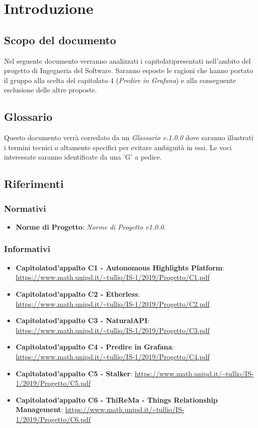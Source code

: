 \section{Introduzione}
\subsection{Scopo del documento}
    Nel seguente documento verranno analizzati i capitolati\glosp presentati nell'ambito del progetto di Ingegneria del Software. Saranno esposte le ragioni che hanno portato il gruppo alla scelta del capitolato 4 (\textit{Predire in Grafana}) e alla conseguente esclusione delle altre proposte.
\subsection{Glossario}
    Questo documento verrà corredato da un \textit{Glossario v.1.0.0} dove saranno illustrati i termini tecnici o altamente specifici per evitare ambiguità in essi. Le voci interessate saranno identificate da una 'G' a pedice.
\subsection{Riferimenti}
\subsubsection{Normativi}
\begin{itemize}
	\item \textbf{Norme di Progetto}: \textit{Norme di Progetto v1.0.0}.
\end{itemize}
\subsubsection{Informativi}
\begin{itemize}
    \item \textbf{Capitolato\glosp d'appalto C1 - Autonomous Highlights Platform}:  \url{https://www.math.unipd.it/~tullio/IS-1/2019/Progetto/C1.pdf}
    \item \textbf{Capitolato\glosp d'appalto C2 - Etherless}:  \url{https://www.math.unipd.it/~tullio/IS-1/2019/Progetto/C2.pdf}
    \item \textbf{Capitolato\glosp d'appalto C3 - NaturalAPI}:  \url{https://www.math.unipd.it/~tullio/IS-1/2019/Progetto/C3.pdf}
    \item \textbf{Capitolato\glosp d'appalto C4 - Predire in Grafana}:  \url{https://www.math.unipd.it/~tullio/IS-1/2019/Progetto/C4.pdf}
    \item \textbf{Capitolato\glosp d'appalto C5 - Stalker}:  \url{https://www.math.unipd.it/~tullio/IS-1/2019/Progetto/C5.pdf}
    \item \textbf{Capitolato\glosp d'appalto C6 - ThiReMa - Things Relationship Management}: \url{https://www.math.unipd.it/~tullio/IS-1/2019/Progetto/C6.pdf}
\end{itemize}
